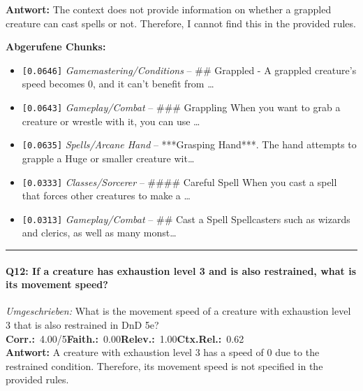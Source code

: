 \noindent\textbf{Antwort:} The context does not provide information on whether a grappled creature can cast spells or not. Therefore, I cannot find this in the provided rules.

\noindent\textbf{Abgerufene Chunks:}
\begin{itemize}[noitemsep, topsep=2pt]
  \item[\textbf{\#1}] \texttt{[0.0646]} \textit{Gamemastering/Conditions} -- \#\# Grappled  - A grappled creature's speed becomes 0, and it can't benefit from \ldots
  \item[\textbf{\#2}] \texttt{[0.0643]} \textit{Gameplay/Combat} -- \#\#\# Grappling  When you want to grab a creature or wrestle with it, you can use \ldots
  \item[\textbf{\#3}] \texttt{[0.0635]} \textit{Spells/Arcane Hand} -- ***Grasping Hand***. The hand attempts to grapple a Huge or smaller creature wit\ldots
  \item[\textbf{\#4}] \texttt{[0.0333]} \textit{Classes/Sorcerer} -- \#\#\#\# Careful Spell  When you cast a spell that forces other creatures to make a \ldots
  \item[\textbf{\#5}] \texttt{[0.0313]} \textit{Gameplay/Combat} -- \#\# Cast a Spell  Spellcasters such as wizards and clerics, as well as many monst\ldots
\end{itemize}
\vspace{4pt}
\hrule
\vspace{6pt}

\paragraph{Q12: If a creature has exhaustion level 3 and is also restrained, what is its movement speed?}
\textit{Umgeschrieben:} What is the movement speed of a creature with exhaustion level 3 that is also restrained in DnD 5e?\\[2pt]
\noindent \textbf{Corr.:}~4.00/5\quad \textbf{Faith.:}~0.00\quad \textbf{Relev.:}~1.00\quad \textbf{Ctx.Rel.:}~0.62\\

\noindent\textbf{Antwort:} A creature with exhaustion level 3 has a speed of 0 due to the restrained condition. Therefore, its movement speed is not specified in the provided rules.

